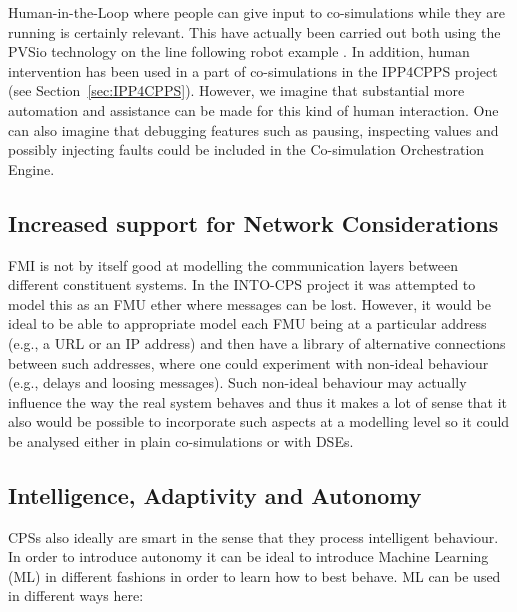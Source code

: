 Human-in-the-Loop where people can give input to co-simulations while they are running is certainly relevant. This have actually been carried out both using the PVSio technology on the line following robot example \cite{Palmieri&17}. In addition, human intervention has been used in a part of co-simulations in the IPP4CPPS project (see Section~\ref{sec:IPP4CPPS}). However, we imagine that substantial more automation and assistance can be made for this kind of human interaction. One can also imagine that debugging features such as pausing, inspecting values and possibly injecting faults could be included in the Co-simulation Orchestration Engine.


\subsection{Increased support for Network Considerations}

FMI is not by itself good at modelling the communication layers between different constituent systems. In the INTO-CPS project it was attempted to model this as an FMU ether where messages can be lost. However, it would be ideal to be able to appropriate model each FMU being at a particular address (e.g., a URL or an IP address) and then have a library of alternative connections between such addresses, where one could experiment with non-ideal behaviour (e.g., delays and loosing messages). Such non-ideal behaviour may actually influence the way the real system behaves and thus it makes a lot of sense that it also would be possible to incorporate such aspects at a modelling level so it could be analysed either in plain co-simulations or with DSEs.


\subsection{Intelligence, Adaptivity and Autonomy}

CPSs also ideally are smart in the sense that they process intelligent behaviour. In order to introduce autonomy it can be ideal to introduce Machine Learning (ML) in different fashions in order to learn how to best behave. ML can be used in different ways here:

